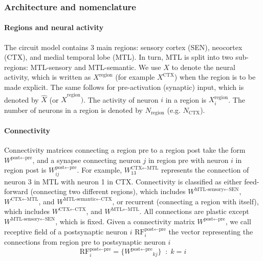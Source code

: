 \documentclass{article}
\begin{document}
\subsubsection*{Architecture and nomenclature}
\paragraph*{Regions and neural activity}
The circuit model contains 3 main regions: sensory cortex (SEN), neocortex (CTX), and medial temporal lobe (MTL). In turn, MTL is split into two sub-regions: MTL-sensory and MTL-semantic. We use $X$ to denote the neural activity, which is written as $X^\textrm{region}$ (for example $X^\textrm{CTX}$) when the region is to be made explicit. The same follows for pre-activation (synaptic) input, which is denoted by $\hat{X}$ (or $\hat{X}^\textrm{region})$. The activity of neuron $i$ in a region is $X^\textrm{region}_i$. The number of neurons in a region is denoted by $N_\textrm{region}$ (e.g. $N_\textrm{CTX}$).
\paragraph{Connectivity}
Connectivity matrices connecting a region \textrm{pre} to a region \textrm{post} take the form $W^{\textrm{post}\leftarrow\textrm{pre}}$, and a synapse connecting neuron $j$ in region pre with neuron $i$ in region post is $W^{\textrm{post}\leftarrow\textrm{pre}}_{ij}$. For example, $W^{\textrm{CTX}\leftarrow\textrm{MTL}}_{13}$ represents the connection of neuron 3 in MTL with neuron 1 in CTX. Connectivity is classified as either feed-forward (connecting two different regions), which includes  $W^{\textrm{MTL-sensory}\leftarrow\textrm{SEN}}$, $W^{\textrm{CTX}\leftarrow\textrm{MTL}}$, and $W^{\textrm{MTL-semantic}\leftarrow\textrm{CTX}}$, or recurrent (connecting a region with itself), which includes $W^{\textrm{CTX}\leftarrow\textrm{CTX}}$, and $W^{\textrm{MTL}\leftarrow\textrm{MTL}}$. All connections are plastic except $W^{\textrm{MTL-sensory}\leftarrow\textrm{SEN}}$, which is fixed. Given a connectivity matrix $W^{\textrm{post}\leftarrow\textrm{pre}}$, we call receptive field of a postsynaptic neuron $i$ $\textrm{RF}^{\textrm{post}\leftarrow\textrm{pre}}_i$ the vector representing the connections from region pre to postsynaptic neuron $i$
\begin{equation}
    \textrm{RF}^{\textrm{post}\leftarrow\textrm{pre}}_i = \{{W^{\textrm{post}\leftarrow\textrm{pre}}}_{kj}\} \;\; : \;k = i 
\end{equation}
\end{document}
